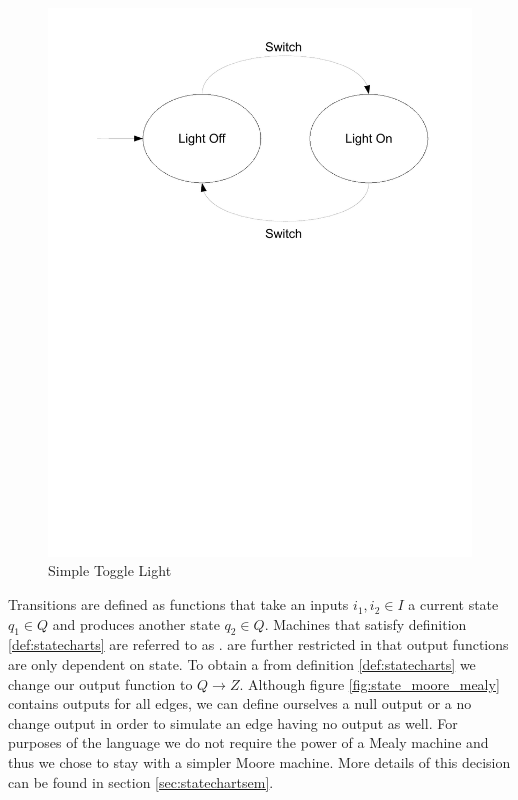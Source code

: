 \begin{figure}[htp]
    \centering
    \includegraphics[trim= 10mm 150mm 10mm 10mm, clip, width=\imgmedium]{./images/state_blink_light.pdf}
    \caption{Simple Toggle Light}
    \label{fig:state_blink_light}
\end{figure}

Transitions are defined as functions that take an inputs $i_1,i_2 \in I$ a current state $q_1 \in Q$ and produces another state $q_2 \in Q$. Machines that satisfy definition \ref{def:statecharts} are referred to as \cite{booth}.  are further restricted in that output functions are only dependent on state. To obtain a  from definition \ref{def:statecharts} we change our output function to $Q \rightarrow Z$. Although figure \ref{fig:state_moore_mealy} contains outputs for all edges, we can define ourselves a null output or a no change output in order to simulate an edge having no output as well. For purposes of the \plccharts language we do not require the power of a Mealy machine and thus we chose to stay with a simpler Moore machine. More details of this decision can be found in section \ref{sec:statechartsem}.

